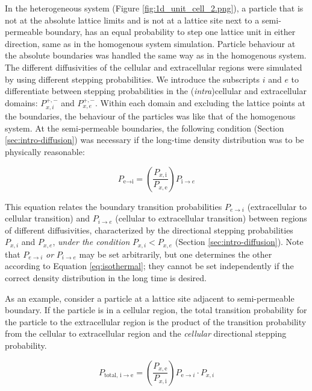 	In the heterogeneous system (Figure \ref{fig:1d_unit_cell_2.png}), a particle that is not at the absolute lattice limits and is not at a lattice site next to a semi-permeable boundary, has an equal probability to step one lattice unit in either direction, same as in the homogenous system simulation. Particle behaviour at the absolute boundaries was handled the same way as in the homogenous system. The different diffusivities of the cellular and extracellular regions were simulated by using different stepping probabilities. We introduce the subscripts $ i $ and $ e $ to differentiate between stepping probabilities in the (\textsl{intra})cellular and extracellular domains: $ P_{x,i}^{+,-} $ and $ P_{x,e}^{+,-} $. Within each domain and excluding the lattice points at the boundaries, the behaviour of the particles was like that of the homogenous system. At the semi-permeable boundaries, the following condition (Section \ref{sec:intro-diffusion}) was necessary if the long-time density distribution was to be physically reasonable:
	
	\begin{equation}
		\label{eq:isothermal}
		P_{\textrm{e}\rightarrow \textrm{i}} = \left( \dfrac{P_{x,\textrm{i}}}{P_{x,\textrm{e}}}\right)  P_{\textrm{i}\rightarrow e}
	\end{equation}
	
	This equation relates the boundary transition probabilities $ P_{e \rightarrow i} $ (extracellular to cellular transition) and $ P_{i \rightarrow e} $ (cellular to extracellular transition) between regions of different diffusivities, characterized by the directional stepping probabilities $ P_{x,i} $ and $ P_{x,e} $, \emph{under the condition} $ P_{x,i} < P_{x,e} $ (Section \ref{sec:intro-diffusion}). Note that $ P_{e \rightarrow i} $ \textsl{or} $ P_{i \rightarrow e} $ may be set arbitrarily, but one determines the other according to Equation \ref{eq:isothermal}; they cannot be set independently if the correct density distribution in the long time is desired. 
	
	As an example, consider a particle at a lattice site adjacent to semi-permeable boundary. If the particle is in a cellular region, the total transition probability for the particle to the extracellular region is the product of the transition probability from the cellular to extracellular region and the \textsl{cellular} directional stepping probability.
	
	\begin{equation}
		\label{eq:total_transition_prob}
		P_{\textrm{total},\, \textrm{i} \rightarrow \textrm{e}} = \left( \dfrac{P_{x,\textrm{e}}}{P_{x,\textrm{i}}}\right)  P_{\textrm{e}\rightarrow i} \cdot P_{x,i}
	\end{equation}
	
